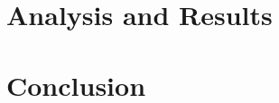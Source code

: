\documentclass[12pt, twocolumn]{aastex62}
\begin{document}
	\section{Analysis and Results}
	
		
	\section{Conclusion}


	
	
	
	
\end{document}

